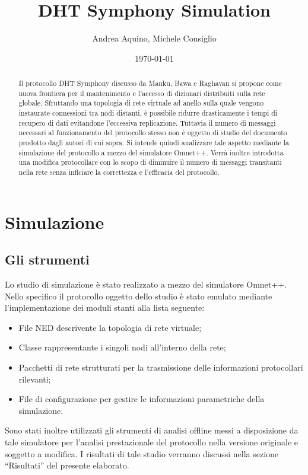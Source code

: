 \documentclass[	
	DIV=calc,
	paper=a4,
	fontsize=11pt,
	onecolumn
]{scrartcl} %
\title{DHT Symphony Simulation}					%
\author{Andrea Aquino, Michele Consiglio}											%
\date{\today}																				%
\begin{document}
	\maketitle
	\thispagestyle{fancy} %
	\begin{abstract}
	Il protocollo DHT Symphony discusso da Manku, Bawa e Raghavan si propone come nuova frontiera per il mantenimento e l'accesso di dizionari distribuiti sulla rete globale. Sfruttando una topologia di rete virtuale ad anello sulla quale vengono instaurate connessioni tra nodi distanti, è possibile ridurre drasticamente i tempi di recupero di dati evitandone l'eccessiva replicazione. Tuttavia il numero di messaggi necessari al funzionamento del protocollo stesso non è oggetto di studio del documento prodotto dagli autori di cui sopra. Si intende quindi analizzare tale aspetto mediante la simulazione del protocollo a mezzo del simulatore Omnet++. Verrà inoltre introdotta una modifica protocollare con lo scopo di diminuire il numero di messaggi transitanti nella rete senza inficiare la correttezza e l'efficacia del protocollo.
	\end{abstract}

\section{Simulazione}
	\subsection{Gli strumenti}
	Lo studio di simulazione è stato realizzato a mezzo del simulatore Omnet++. Nello specifico il protocollo oggetto dello studio è stato emulato mediante l'implementazione dei moduli stanti alla lista seguente:
	\begin{itemize}
		\item File NED descrivente la topologia di rete virtuale;
		\item Classe rappresentante i singoli nodi all'interno della rete;
		\item Pacchetti di rete strutturati per la trasmissione delle informazioni protocollari rilevanti;
		\item File di configurazione per gestire le informazioni parametriche della simulazione.
	\end{itemize}
	Sono stati inoltre utilizzati gli strumenti di analisi offline messi a disposizione da tale simulatore per l'analisi prestazionale del protocollo nella versione originale e soggetto a modifica. I risultati di tale studio verranno discussi nella sezione ``Risultati'' del presente elaborato.
\end{document}
